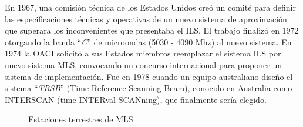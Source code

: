 En 1967, una comisión técnica de los Estados Unidos creó un comité para definir las especificaciones técnicas y operativas de un nuevo sistema de aproximación que superara los inconvenientes
que presentaba el ILS. El trabajo finalizó en 1972 otorgando la banda ``\emph{C}'' de microondas (5030 - 4090 Mhz) al nuevo sistema. En 1974 la OACI solicitó a sus Estados miembros reemplazar el sistema
ILS por nuevo sistema MLS, convocando un concurso internacional para proponer un sistema de
implementación. Fue en 1978 cuando un equipo australiano diseño el sistema ``\emph{TRSB}'' (Time Reference Scanning Beam), conocido en Australia como INTERSCAN (time INTERval SCANning), que
finalmente sería elegido.

\begin{figure}[!htb]
  \centering


  
  \caption{Estaciones terrestres de MLS}
  \label{fig:06.MLS.estaciones}
\end{figure}



